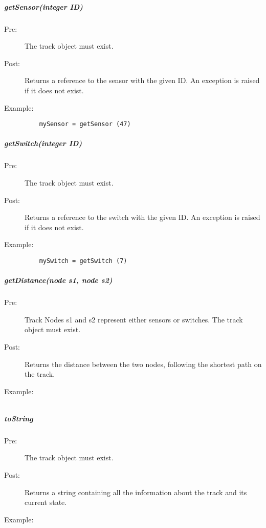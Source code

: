 \documentclass[a4paper,11pt,notitlepage]{article}
\def\TN{Track Node\xspace}
\begin{document}
\subparagraph{getSensor(integer ID)}
\begin{description}
\item[\hspace{1cm}Pre:] The track object must exist.
\item[\hspace{1cm}Post:] Returns a reference to the sensor with the given ID. An exception is raised if it does not exist.
\item[\hspace{1cm}Example:]
\begin{verbatim}
    mySensor = getSensor (47)
\end{verbatim}
\end{description}

\subparagraph{getSwitch(integer ID)}
\begin{description}
\item[\hspace{1cm}Pre:] The track object must exist.
\item[\hspace{1cm}Post:] Returns a reference to the switch with the given ID. An exception is raised if it does not exist.
\item[\hspace{1cm}Example:]
\begin{verbatim}
    mySwitch = getSwitch (7)
\end{verbatim}
\end{description}


\subparagraph{getDistance(node s1, node s2)}
\begin{description}
\item[\hspace{1cm}Pre:] \TN{}s s1 and s2 represent either sensors or switches. The track object must exist.
\item[\hspace{1cm}Post:] Returns the distance between the two nodes, following the shortest path on the track.
\item[\hspace{1cm}Example:]
\begin{verbatim}

\end{verbatim}
\end{description}


\subparagraph{toString}
\begin{description}
\item[\hspace{1cm}Pre:] The track object must exist.
\item[\hspace{1cm}Post:] Returns a string containing all the information about the track and its current state.
\item[\hspace{1cm}Example:]
\begin{verbatim}
    
\end{verbatim}
\end{description}
\end{document}
